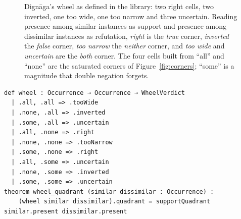 \documentclass[11pt]{article}
\theoremstyle{plain}
\theoremstyle{definition}
\begin{document}
\begin{figure}[ht]
\centering
{}
\caption{Dignāga's wheel as defined in the library: two right cells, two inverted, one too
wide, one too narrow and three uncertain. Reading presence among similar instances as
support and presence among dissimilar instances as refutation, \emph{right} is the
\emph{true} corner, \emph{inverted} the \emph{false} corner, \emph{too narrow} the
\emph{neither} corner, and \emph{too wide} and \emph{uncertain} are the \emph{both} corner.
The four cells built from ``all'' and ``none'' are the saturated corners of
Figure~\ref{fig:corners}; ``some'' is a magnitude that double negation forgets.}
\label{fig:wheel}
\end{figure}

\begin{lstlisting}
def wheel : Occurrence → Occurrence → WheelVerdict
  | .all, .all => .tooWide
  | .none, .all => .inverted
  | .some, .all => .uncertain
  | .all, .none => .right
  | .none, .none => .tooNarrow
  | .some, .none => .right
  | .all, .some => .uncertain
  | .none, .some => .inverted
  | .some, .some => .uncertain
theorem wheel_quadrant (similar dissimilar : Occurrence) :
    (wheel similar dissimilar).quadrant = supportQuadrant similar.present dissimilar.present
\end{lstlisting}
\end{document}
